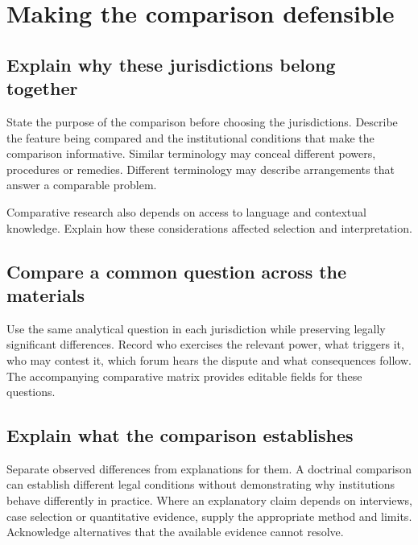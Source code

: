 \chapter{Making the comparison defensible}\label{ch:comparison}
\section{Explain why these jurisdictions belong together}
State the purpose of the comparison before choosing the jurisdictions.
Describe the feature being compared and the institutional conditions that make
the comparison informative. Similar terminology may conceal different powers,
procedures or remedies. Different terminology may describe arrangements that
answer a comparable problem.

Comparative research also depends on access to language and contextual
knowledge. Explain how these considerations affected selection and interpretation.

\section{Compare a common question across the materials}
Use the same analytical question in each jurisdiction while preserving legally
significant differences. Record who exercises the relevant power, what triggers
it, who may contest it, which forum hears the dispute and what consequences
follow. The accompanying comparative matrix provides editable fields for these
questions.


\section{Explain what the comparison establishes}
Separate observed differences from explanations for them. A doctrinal comparison
can establish different legal conditions without demonstrating why institutions
behave differently in practice. Where an explanatory claim depends on interviews,
case selection or quantitative evidence, supply the appropriate method and
limits. Acknowledge alternatives that the available evidence cannot resolve.
